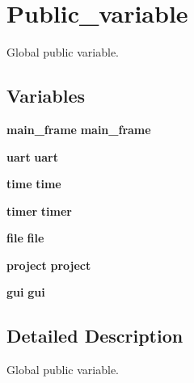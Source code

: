 \section{Public\+\_\+variable}
\label{group___public__variable}


Global public variable.  


\subsection*{Variables}
\begin{DoxyCompactItemize}
\item 
\mbox{\label{group___public__variable_ga796cadbcb2c234d26f5370d752b84f16}} 
\textbf{ main\+\_\+frame} {\bfseries main\+\_\+frame}
\item 
\mbox{\label{group___public__variable_ga21b1f8e817aef8ac44b5920ba4025964}} 
\textbf{ uart} {\bfseries uart}
\item 
\mbox{\label{group___public__variable_ga8d8d488a6301e451e4423b66d40ec1bc}} 
\textbf{ time} {\bfseries time}
\item 
\mbox{\label{group___public__variable_ga62142ce7fb7a7193617b18c1214840f8}} 
\textbf{ timer} {\bfseries timer}
\item 
\mbox{\label{group___public__variable_gadd5520a4b835451cd738cf561b50603d}} 
\textbf{ file} {\bfseries file}
\item 
\mbox{\label{group___public__variable_gabb53bb526e8245fad5e74ba34fd6f62e}} 
\textbf{ project} {\bfseries project}
\item 
\mbox{\label{group___public__variable_ga5b2ffac148e36129724aa08550ef89fc}} 
\textbf{ gui} {\bfseries gui}
\end{DoxyCompactItemize}


\subsection{Detailed Description}
Global public variable. 

